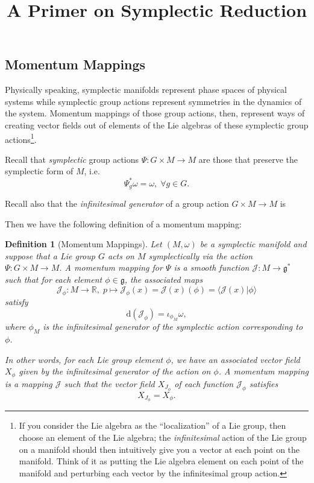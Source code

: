 \documentclass{tufte-handout}
\title{A Primer on Symplectic Reduction}
\newtheorem{defn}{Definition}
\begin{document}
\subsection{Momentum Mappings}
Physically speaking, symplectic manifolds represent phase spaces of physical systems while symplectic group actions represent symmetries in the dynamics of the system. Momentum mappings of those group actions, then, represent ways of creating vector fields out of elements of the Lie algebras of these symplectic group actions\footnote{If you consider the Lie algebra as the ``localization'' of a Lie group, then choose an element of the Lie algebra; the \emph{infinitesimal} action of the Lie group on a manifold should then intuitively give you a vector at each point on the manifold. Think of it as putting the Lie algebra element on each point of the manifold and perturbing each vector by the infinitesimal group action.}.

Recall that \emph{symplectic} group actions $\Psi : G \times M \to M$ are those that preserve the symplectic form of $M$, i.e.
$$
\Psi^*_g \omega = \omega, \; \forall g \in G.
$$

Recall also that the \emph{infinitesimal generator} of a group action $G \times M \to M$ is %

Then we have the following definition of a momentum mapping:
\begin{fullwidth}
\begin{defn}[Momentum Mappings]
Let $(M,\omega)$ be a symplectic manifold and suppose that a Lie group $G$ acts on $M$ symplectically via the action $\Psi: G \times M \to M$. A \emph{momentum mapping} for $\Psi$ is a smooth function $\mathcal{J}: M \to \mathfrak{g}^*$ such that for each element $\phi \in \mathfrak{g}$, the associated maps
$$
\mathcal{J}_\phi : M \to \mathbb{R}, \; p \mapsto \mathcal{J}_\phi(x) = \mathcal{J}(x)(\phi) = \langle \mathcal{J}(x) | \phi \rangle
$$
satisfy
$$
\mathrm{d}(\mathcal{J}_\phi) = \iota_{\phi_M} \omega,
$$
where $\phi_M$ is the infinitesimal generator of the symplectic action corresponding to $\phi$.

In other words, for each Lie group element $\phi$, we have an associated vector field $X_\phi$ given by the infinitesimal generator of the action on $\phi$. A momentum mapping is a mapping $\mathcal{J}$ such that the vector field $X_{J_\phi}$ of each function $\mathcal{J}_\phi$ satisfies
$$
X_{J_\phi} = X_\phi.
$$
\end{defn}
\end{fullwidth}

\end{document}
